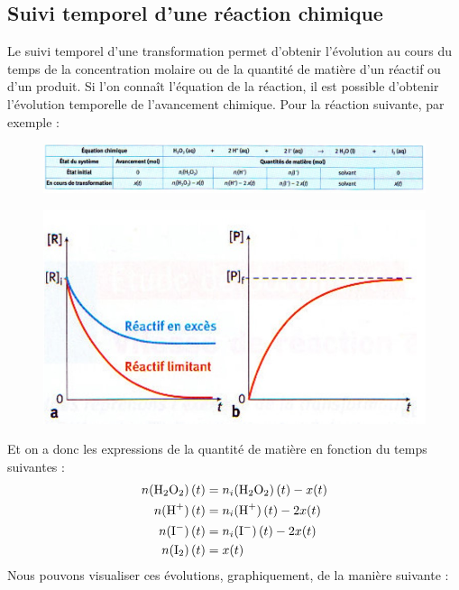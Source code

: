 \documentclass[11pt,a4paper]{article}
\begin{document}
\subsection{Suivi temporel d'une réaction chimique}

Le suivi temporel d’une transformation permet d’obtenir l’évolution au cours du temps de la concentration molaire ou de la quantité de matière d’un réactif ou d’un produit.  Si l’on connaît l’équation de la réaction, il est possible d’obtenir l’évolution temporelle de l’avancement chimique. Pour la réaction suivante, par exemple :

\begin{figure}[h]
    \centering
    \includegraphics[width=\linewidth]{imgs/c4/tableau.jpg}
\end{figure}
\begingroup
\begin{figure}
  \centering\includegraphics[width=0.95\linewidth]{imgs/c4/reactlimit.jpg}
\end{figure}

Et on a donc les expressions de la quantité de matière en fonction du temps suivantes : 
\begin{align*}
    n({\ce{H2O2}})\left(t\right) &= n_i({\ce{H2O2}})\left(t\right) - x(t) \\
    n({\ce{H+}})\left(t\right) &= n_i({\ce{H+}})\left(t\right) - 2x(t) \\
    n({\ce{I-}})\left(t\right) &= n_i({\ce{I-}})\left(t\right) - 2x(t) \\
    n({\ce{I2}})\left(t\right) &= x(t) \\
\end{align*}
Nous pouvons visualiser ces évolutions, graphiquement, de la manière suivante :
\end{document}
